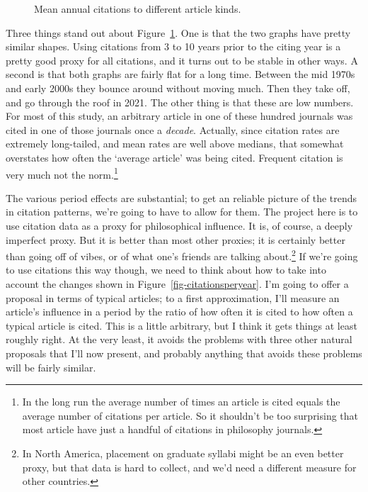 \documentclass[
  12pt,
  letterpaper,
  DIV=11,
  numbers=noendperiod]{scrartcl}
\begin{document}
\begin{figure}
\begin{minipage}{\linewidth}
{}


\end{minipage}%

\caption{\label{fig-citationrate}Mean annual citations to different
article kinds.}

\end{figure}%

Three things stand out about Figure~\ref{fig-citationrate}. One is that
the two graphs have pretty similar shapes. Using citations from 3 to 10
years prior to the citing year is a pretty good proxy for all citations,
and it turns out to be stable in other ways. A second is that both
graphs are fairly flat for a long time. Between the mid 1970s and early
2000s they bounce around without moving much. Then they take off, and go
through the roof in 2021. The other thing is that these are low numbers.
For most of this study, an arbitrary article in one of these hundred
journals was cited in one of those journals once a \emph{decade}.
Actually, since citation rates are extremely long-tailed, and mean rates
are well above medians, that somewhat overstates how often the `average
article' was being cited. Frequent citation is very much not the
norm.\footnote{In the long run the average number of times an article is
  cited equals the average number of citations per article. So it
  shouldn't be too surprising that most article have just a handful of
  citations in philosophy journals.}

The various period effects are substantial; to get an reliable picture
of the trends in citation patterns, we're going to have to allow for
them. The project here is to use citation data as a proxy for
philosophical influence. It is, of course, a deeply imperfect proxy. But
it is better than most other proxies; it is certainly better than going
off of vibes, or of what one's friends are talking about.\footnote{In
  North America, placement on graduate syllabi might be an even better
  proxy, but that data is hard to collect, and we'd need a different
  measure for other countries.} If we're going to use citations this way
though, we need to think about how to take into account the changes
shown in Figure~\ref{fig-citationsperyear}. I'm going to offer a
proposal in terms of typical articles; to a first approximation, I'll
measure an article's influence in a period by the ratio of how often it
is cited to how often a typical article is cited. This is a little
arbitrary, but I think it gets things at least roughly right. At the
very least, it avoids the problems with three other natural proposals
that I'll now present, and probably anything that avoids these problems
will be fairly similar.
\end{document}
